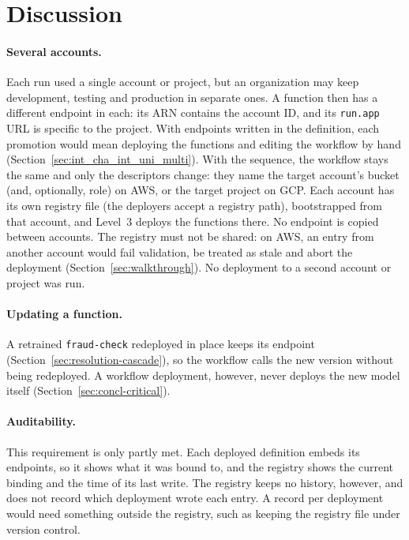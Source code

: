 \section{Discussion}
\label{sec:case-discussion}

\paragraph{Several accounts.} Each run used a single account or project, but an organization may
keep development, testing and production in separate ones. A function then has a different
endpoint in each: its ARN contains the account ID, and its \texttt{run.app} URL is specific to the
project. With endpoints written in the definition, each promotion would mean deploying the
functions and editing the workflow by hand (Section~\ref{sec:int_cha_int_uni_multi}). With the
sequence, the workflow stays the same and only the descriptors change: they name the target
account's bucket (and, optionally, role) on AWS, or the target project on GCP. Each account has its
own registry file (the deployers accept a registry path), bootstrapped from that account, and
Level~3 deploys the functions there. No endpoint is copied between accounts. The registry must not
be shared: on AWS, an entry from another account would fail validation, be treated as stale and
abort the deployment (Section~\ref{sec:walkthrough}). No deployment to a second account or project
was run.

\paragraph{Updating a function.} A retrained \texttt{fraud-check} redeployed in place keeps its
endpoint (Section~\ref{sec:resolution-cascade}), so the workflow calls the new version without
being redeployed. A workflow deployment, however, never deploys the new model itself
(Section~\ref{sec:concl-critical}).

\paragraph{Auditability.} This requirement is only partly met. Each deployed definition embeds its
endpoints, so it shows what it was bound to, and the registry shows the current binding and the
time of its last write. The registry keeps no history, however, and does not record which
deployment wrote each entry. A record per deployment would need something outside the registry,
such as keeping the registry file under version control.

